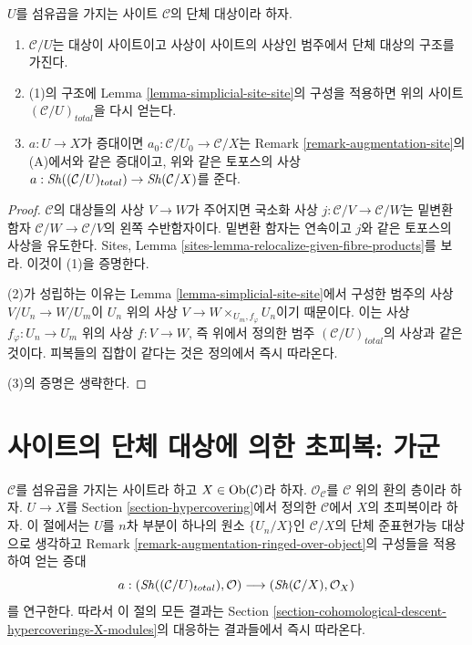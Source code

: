 \begin{lemma}
\label{lemma-sr-when-fibre-products}
$U$를 섬유곱을 가지는 사이트 $\mathcal{C}$의 단체 대상이라 하자.
\begin{enumerate}
\item $\mathcal{C}/U$는 대상이 사이트이고 사상이 사이트의 사상인
범주에서 단체 대상의 구조를 가진다.
\item (1)의 구조에 Lemma \ref{lemma-simplicial-site-site}의 구성을
적용하면 위의 사이트 $(\mathcal{C}/U)_{total}$을 다시 얻는다.
\item $a : U \to X$가 증대이면
$a_0 : \mathcal{C}/U_0 \to \mathcal{C}/X$는 Remark
\ref{remark-augmentation-site}의 (A)에서와 같은 증대이고, 위와 같은
토포스의 사상
$a : \mathop{\mathit{Sh}}\nolimits((\mathcal{C}/U)_{total}) \to \mathop{\mathit{Sh}}\nolimits(\mathcal{C}/X)$를 준다.
\end{enumerate}
\end{lemma}

\begin{proof}
$\mathcal{C}$의 대상들의 사상 $V \to W$가 주어지면 국소화 사상
$j : \mathcal{C}/V \to \mathcal{C}/W$는 밑변환 함자
$\mathcal{C}/W \to \mathcal{C}/V$의 왼쪽 수반함자이다. 밑변환 함자는
연속이고 $j$와 같은 토포스의 사상을 유도한다. Sites, Lemma
\ref{sites-lemma-relocalize-given-fibre-products}를 보라. 이것이 (1)을
증명한다.

\medskip\noindent
(2)가 성립하는 이유는 Lemma \ref{lemma-simplicial-site-site}에서
구성한 범주의 사상 $V/U_n \to W/U_m$이 $U_n$ 위의 사상
$V \to W \times_{U_m, f_\varphi} U_n$이기 때문이다. 이는 사상
$f_\varphi : U_n \to U_m$ 위의 사상 $f : V \to W$, 즉 위에서 정의한
범주 $(\mathcal{C}/U)_{total}$의 사상과 같은 것이다. 피복들의 집합이
같다는 것은 정의에서 즉시 따라온다.

\medskip\noindent
(3)의 증명은 생략한다.
\end{proof}

\section{사이트의 단체 대상에 의한 초피복: 가군}
\label{section-hypercovering-modules}

\noindent
$\mathcal{C}$를 섬유곱을 가지는 사이트라 하고
$X \in \mathop{\mathrm{Ob}}\nolimits(\mathcal{C})$라 하자. $\mathcal{O}_\mathcal{C}$를
$\mathcal{C}$ 위의 환의 층이라 하자. $U \to X$를 Section
\ref{section-hypercovering}에서 정의한 $\mathcal{C}$에서 $X$의
초피복이라 하자. 이 절에서는 $U$를 $n$차 부분이 하나의 원소
$\{U_n/X\}$인 $\mathcal{C}/X$의 단체 준표현가능 대상으로 생각하고
Remark \ref{remark-augmentation-ringed-over-object}의 구성들을 적용하여
얻는 증대
$$
a :
(\mathop{\mathit{Sh}}\nolimits((\mathcal{C}/U)_{total}), \mathcal{O})
\longrightarrow
(\mathop{\mathit{Sh}}\nolimits(\mathcal{C}/X), \mathcal{O}_X)
$$
를 연구한다.
따라서 이 절의 모든 결과는 Section
\ref{section-cohomological-descent-hypercoverings-X-modules}의 대응하는
결과들에서 즉시 따라온다.

